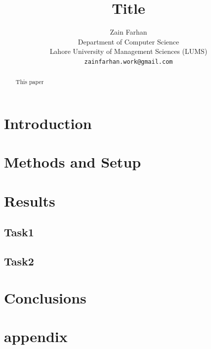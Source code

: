 \documentclass{article}
\title{Title}
\author{%
  Zain Farhan \\
  Department of Computer Science \\
  Lahore University of Management Sciences (LUMS) \\
  \texttt{zainfarhan.work@gmail.com} \\
}
\begin{document}
\maketitle


\begin{abstract}
  This paper
\end{abstract}



\section{Introduction}

\section{Methods and Setup}

\section{Results}

\subsection{Task1}

\subsection{Task2}

\section{Conclusions}

% 
% 


\appendix
\section*{appendix}
\end{document}
